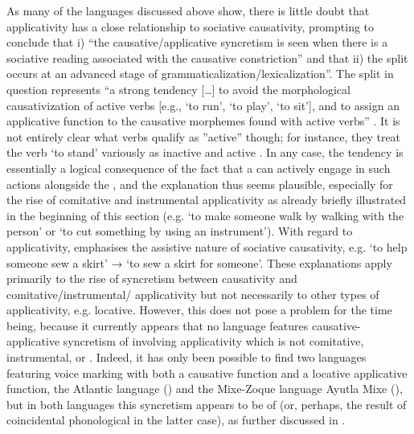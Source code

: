 As many of the languages discussed above show, there is little doubt that applicativity has a close relationship to sociative causativity, prompting \citet[121]{shibatani:pardeshi:2002} to conclude that i) “the causative/applicative syncretism is seen when there is a sociative reading associated with the causative constriction” and that ii) the split occurs at an advanced stage of grammaticalization/lexicalization”. The split in question represents “a strong tendency […] to avoid the morphological causativization of active verbs [e.g., ‘to run’, ‘to play’, ‘to sit’], and to assign an applicative function to the causative morphemes found with active verbs” \citep[118]{shibatani:pardeshi:2002}. It is not entirely clear what verbs qualify as ”active” though; for instance, they treat the verb ‘to stand’ variously as inactive and active \citep[116, 119]{shibatani:pardeshi:2002}. In any case, the tendency is essentially a logical consequence of the fact that a  can actively engage in such actions alongside the , and the explanation thus seems plausible, especially for the rise of comitative and instrumental applicativity as already briefly illustrated in the beginning of this section (e.g. ‘to make someone walk by walking with the person’ or ‘to cut something by using an instrument’). With regard to  applicativity, \citet[11f.]{malchukov:2017} emphasises the assistive nature of sociative causativity, e.g. ‘to help someone sew a skirt’ → ‘to sew a skirt for someone’. These explanations apply primarily to the rise of syncretism between causativity and comitative/instrumental/ applicativity but not necessarily to other types of applicativity, e.g. locative. However, this does not pose a problem for the time being, because it currently appears that no language features causative-applicative syncretism of  involving applicativity which is not comitative, instrumental, or . Indeed, it has only been possible to find two languages featuring voice marking with both a causative function and a locative applicative function, the Atlantic language  () and the Mixe-Zoque language Ayutla Mixe (), but in both languages this syncretism appears to be of  (or, perhaps, the result of coincidental phonological  in the latter case), as further discussed in .


